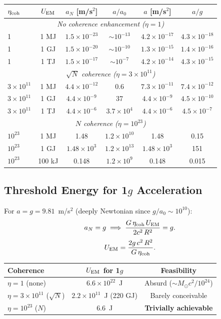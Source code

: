 \documentclass[aps,prd,twocolumn,superscriptaddress,nofootinbib]{revtex4-2}
\newcommand{\ee}[1]{\times 10^{#1}}
\begin{document}
\begin{center}
\begin{tabular}{lccccc}
\toprule
$\eta_{\rm coh}$ & $U_{\rm EM}$ & $a_N$ [m/s$^2$] & $a/a_0$ & $a$ [m/s$^2$] & $a/g$ \\
\midrule
\multicolumn{6}{c}{\textit{No coherence enhancement ($\eta = 1$)}} \\
1 & 1 MJ & $1.5\ee{-23}$ & $\sim 10^{-13}$ & $4.2\ee{-17}$ & $4.3\ee{-18}$ \\
1 & 1 GJ & $1.5\ee{-20}$ & $\sim 10^{-10}$ & $1.3\ee{-15}$ & $1.4\ee{-16}$ \\
1 & 1 TJ & $1.5\ee{-17}$ & $\sim 10^{-7}$ & $4.2\ee{-14}$ & $4.3\ee{-15}$ \\
\midrule
\multicolumn{6}{c}{\textit{$\sqrt{N}$ coherence ($\eta = 3\times 10^{11}$)}} \\
$3\ee{11}$ & 1 MJ & $4.4\ee{-12}$ & 0.6 & $7.3\ee{-11}$ & $7.4\ee{-12}$ \\
$3\ee{11}$ & 1 GJ & $4.4\ee{-9}$ & 37 & $4.4\ee{-9}$ & $4.5\ee{-10}$ \\
$3\ee{11}$ & 1 TJ & $4.4\ee{-6}$ & $3.7\ee{4}$ & $4.4\ee{-6}$ & $4.5\ee{-7}$ \\
\midrule
\multicolumn{6}{c}{\textit{$N$ coherence ($\eta = 10^{23}$)}} \\
$10^{23}$ & 1 MJ & 1.48 & $1.2\ee{10}$ & 1.48 & 0.15 \\
$10^{23}$ & 1 GJ & $1.48\ee{3}$ & $1.2\ee{13}$ & $1.48\ee{3}$ & 151 \\
$10^{23}$ & 100 kJ & 0.148 & $1.2\ee{9}$ & 0.148 & 0.015 \\
\bottomrule
\end{tabular}
\end{center}

\subsection{Threshold Energy for 1$g$ Acceleration}

For $a = g = 9.81$~m/s$^2$ (deeply Newtonian since $g/a_0 \sim 10^{10}$):
\begin{equation}
a_N = g \implies \frac{G\,\eta_{\rm coh}\,U_{\rm EM}}{2c^2\,R^2} = g.
\end{equation}
\begin{equation}
U_{\rm EM} = \frac{2g\,c^2\,R^2}{G\,\eta_{\rm coh}}.
\end{equation}

\begin{center}
\begin{tabular}{lcc}
\toprule
Coherence & $U_{\rm EM}$ for 1$g$ & Feasibility \\
\midrule
$\eta = 1$ (none) & $6.6\ee{22}$~J & Absurd ($\sim M_\odot c^2/10^{24}$) \\
$\eta = 3\ee{11}$ ($\sqrt{N}$) & $2.2\ee{11}$~J (220 GJ) & Barely conceivable \\
$\eta = 10^{23}$ ($N$) & $6.6$~J & \textbf{Trivially achievable} \\
\bottomrule
\end{tabular}
\end{center}
\end{document}
